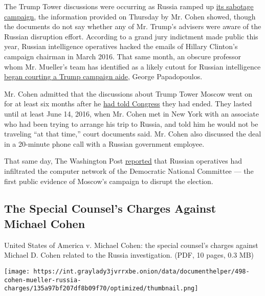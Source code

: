 The Trump Tower discussions were occurring as Russia ramped up
\href{https://www.nytimes3xbfgragh.onion/2016/12/13/us/politics/russia-hack-election-dnc.html}{its
sabotage campaign}, the information provided on Thursday by Mr. Cohen
showed, though the documents do not say whether any of Mr. Trump's
advisers were aware of the Russian disruption effort. According to a
grand jury indictment made public this year, Russian intelligence
operatives hacked the emails of Hillary Clinton's campaign chairman in
March 2016. That same month, an obscure professor whom Mr. Mueller's
team has identified as a likely cutout for Russian intelligence
\href{https://www.nytimes3xbfgragh.onion/2017/12/30/us/politics/how-fbi-russia-investigation-began-george-papadopoulos.html}{began
courting a Trump campaign aide}, George Papadopoulos.

Mr. Cohen admitted that the discussions about Trump Tower Moscow went on
for at least six months after he
\href{https://www.nytimes3xbfgragh.onion/2017/08/30/us/politics/trump-russia-michael-cohen.html}{had
told Congress} they had ended. They lasted until at least June 14, 2016,
when Mr. Cohen met in New York with an associate who had been trying to
arrange his trip to Russia, and told him he would not be traveling ``at
that time,'' court documents said. Mr. Cohen also discussed the deal in
a 20-minute phone call with a Russian government employee.

That same day, The Washington Post
\href{https://www.washingtonpost.com/world/national-security/russian-government-hackers-penetrated-dnc-stole-opposition-research-on-trump/2016/06/14/cf006cb4-316e-11e6-8ff7-7b6c1998b7a0_story.html?utm_term=.bc6441d4b944}{reported}
that Russian operatives had infiltrated the computer network of the
Democratic National Committee --- the first public evidence of Moscow's
campaign to disrupt the election.

\hypertarget{the-special-counsels-charges-against-michael-cohen}{%
\subsection{The Special Counsel's Charges Against Michael
Cohen}\label{the-special-counsels-charges-against-michael-cohen}}

United States of America v. Michael Cohen: the special counsel's charges
against Michael D. Cohen related to the Russia investigation. (PDF, 10
pages, 0.3 MB)

\texttt{[image: https://int.graylady3jvrrxbe.onion/data/documenthelper/498-cohen-mueller-russia-charges/135a97bf207df8b09f70/optimized/thumbnail.png]}

